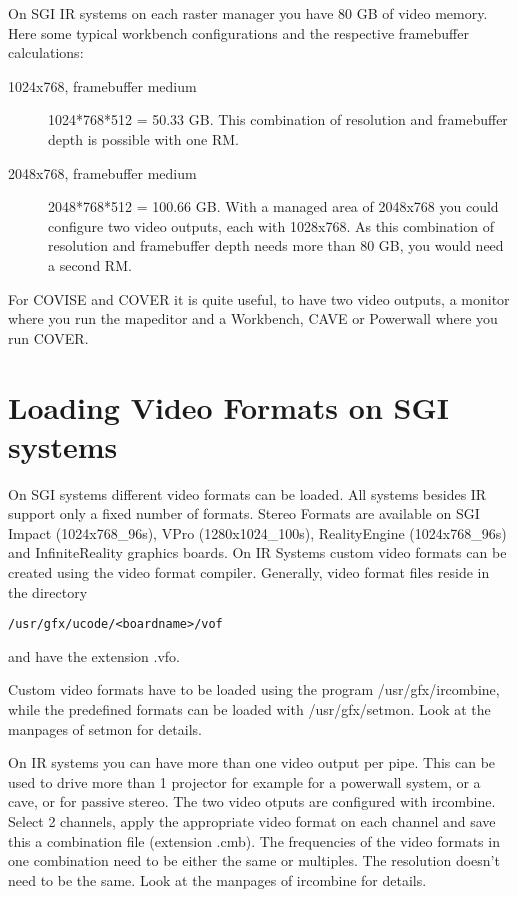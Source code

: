 On SGI IR systems on each raster manager you have 80 GB of video memory. Here some typical
workbench configurations and the respective framebuffer calculations:

\begin{description}

\item [1024x768, framebuffer medium]
1024*768*512 = 50.33 GB. This combination of resolution and framebuffer depth is
 possible with one RM.

\item [2048x768, framebuffer medium]
2048*768*512 = 100.66 GB. With a managed area of 2048x768 you could configure 
two video outputs, each with 1028x768.
As this combination of resolution and framebuffer depth needs
more than 80 GB, you would need a second RM.

\end{description}

For COVISE and COVER it is quite useful, to have two video outputs, a monitor where
you run the mapeditor and a Workbench, CAVE or Powerwall where you run COVER.

\section{Loading Video Formats on SGI systems}
On SGI systems different video formats can be loaded. All systems besides
IR support only a fixed number of formats. Stereo Formats
are available on SGI Impact (1024x768\_96s), VPro (1280x1024\_100s), RealityEngine
(1024x768\_96s) and
InfiniteReality graphics boards. On IR Systems custom video formats
can be created using the video format compiler. Generally,
video format files reside in the directory 
\begin{verbatim}
/usr/gfx/ucode/<boardname>/vof
\end{verbatim}
and have the extension .vfo.

Custom video formats have to be loaded using the program /usr/gfx/ircombine,
while the predefined formats can be loaded with /usr/gfx/setmon. Look at the
manpages of setmon for details.

On IR systems you can have more than one video output per pipe. This can be
used to drive more than 1 projector for example for a powerwall system,
or a cave, or for passive stereo. The two video otputs are configured
with ircombine. Select 2 channels, apply the appropriate video format
on each channel and save this a combination file (extension .cmb).
The frequencies of the video formats in one combination need to be either
the same or multiples. The resolution doesn't need to be the same. Look
at the manpages of ircombine for details.


